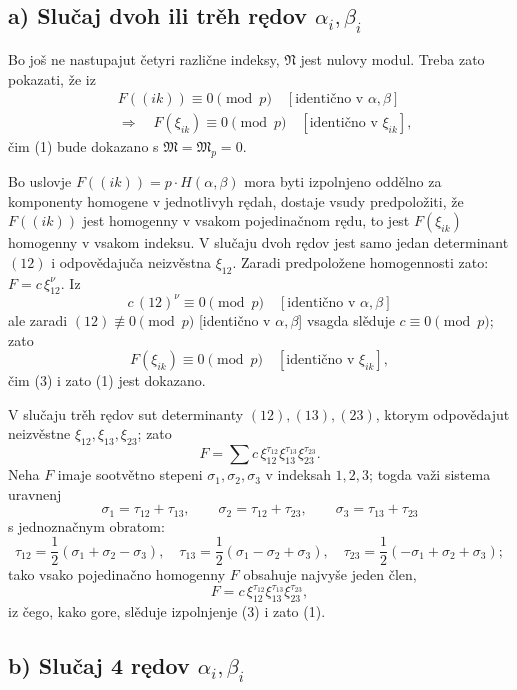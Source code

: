 \documentclass[11pt]{article}
\providecommand{\frM}{\mathfrak M}
\providecommand{\frN}{\mathfrak N}
\begin{document}
\subsection*{a) Slučaj dvoh ili trěh rędov \(\alpha_i,\beta_i\)}

Bo još ne nastupajut četyri različne indeksy, \(\frN\) jest nulovy modul. Treba zato pokazati, že iz
\begin{equation}
\begin{aligned}
        &F((ik))\equiv0\pmod p\quad [\text{identično v \(\alpha,\beta\)}]\\
        &\Longrightarrow\quad
        F(\xi_{ik})\equiv0\pmod p\quad [\text{identično v \(\xi_{ik}\)}],
\end{aligned}
\end{equation}
čim (1) bude dokazano s \(\frM=\frM_p=0\).

Bo uslovje \(F((ik))=p\cdot H(\alpha,\beta)\) mora byti izpolnjeno oddělno za komponenty homogene v jednotlivyh rędah, dostaje vsudy predpoložiti, že \(F((ik))\) jest homogenny v vsakom pojedinačnom rędu, to jest \(F(\xi_{ik})\) homogenny v vsakom indeksu. V slučaju dvoh rędov jest samo jedan determinant \((12)\) i odpovědajuča neizvěstna \(\xi_{12}\). Zaradi predpoložene homogennosti zato: \(F=c\,\xi_{12}^\nu\). Iz
\[
        c\,(12)^\nu\equiv0\pmod p\quad[\text{identično v \(\alpha,\beta\)}]
\]
ale zaradi \((12)\not\equiv0\pmod p\) [identično v \(\alpha,\beta\)] vsagda slěduje \(c\equiv0\pmod p\); zato
\[
        F(\xi_{ik})\equiv0\pmod p\quad [\text{identično v \(\xi_{ik}\)}],
\]
čim (3) i zato (1) jest dokazano.

V slučaju trěh rędov sut determinanty \((12),(13),(23)\), ktorym odpovědajut neizvěstne \(\xi_{12},\xi_{13},\xi_{23}\); zato
\[
        F=\sum c\,\xi_{12}^{\tau_{12}}\xi_{13}^{\tau_{13}}\xi_{23}^{\tau_{23}}.
\]
Neha \(F\) imaje sootvětno stepeni \(\sigma_1,\sigma_2,\sigma_3\) v indeksah \(1,2,3\); togda važi sistema uravnenj
\[
        \sigma_1=\tau_{12}+\tau_{13},\qquad
        \sigma_2=\tau_{12}+\tau_{23},\qquad
        \sigma_3=\tau_{13}+\tau_{23}
\]
s jednoznačnym obratom:
\[
        \tau_{12}=\frac12(\sigma_1+\sigma_2-\sigma_3),\quad
        \tau_{13}=\frac12(\sigma_1-\sigma_2+\sigma_3),\quad
        \tau_{23}=\frac12(-\sigma_1+\sigma_2+\sigma_3);
\]
tako vsako pojedinačno homogenny \(F\) obsahuje najvyše jeden člen,
\[
        F=c\,\xi_{12}^{\tau_{12}}\xi_{13}^{\tau_{13}}\xi_{23}^{\tau_{23}},
\]
iz čego, kako gore, slěduje izpolnjenje (3) i zato (1).

\subsection*{b) Slučaj 4 rędov \(\alpha_i,\beta_i\)}
\end{document}
